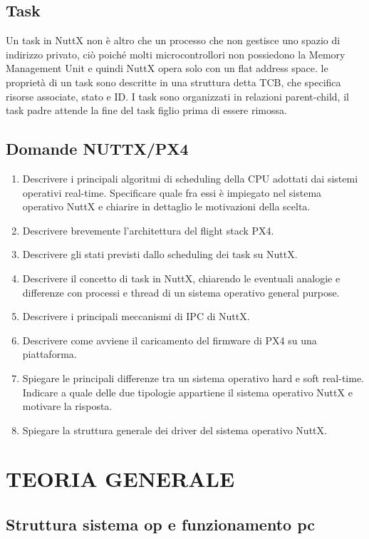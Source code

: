 \documentclass{report}
\begin{document}
\section{Task}
 Un task in NuttX non è altro che un processo che non gestisce uno spazio di indirizzo privato, ciò poiché molti microcontrollori non possiedono la Memory Management Unit e quindi NuttX opera solo con un flat address space. le proprietà di un task sono descritte in una struttura detta TCB, che specifica risorse associate, stato e ID. I task sono organizzati in relazioni parent-child, il task padre attende la fine del task figlio prima di essere rimossa.
\newpage
\section{Domande NUTTX/PX4}
\begin{enumerate}
    \item Descrivere i principali algoritmi di scheduling della CPU adottati dai sistemi operativi real-time. Specificare quale fra essi è impiegato nel sistema operativo NuttX e chiarire in dettaglio le motivazioni della scelta.
    \item Descrivere brevemente l’architettura del flight stack PX4.
    \item Descrivere gli stati previsti dallo scheduling dei task su NuttX.
    \item Descrivere il concetto di task in NuttX, chiarendo le eventuali analogie e differenze con processi e thread di un sistema operativo general purpose.
    \item Descrivere i principali meccanismi di IPC di NuttX.
    \item Descrivere come avviene il caricamento del firmware di PX4 su una piattaforma.
    \item Spiegare le principali differenze tra un sistema operativo hard e soft real-time. Indicare a quale delle due tipologie appartiene il sistema operativo NuttX e motivare la risposta.
    \item Spiegare la struttura generale dei driver del sistema operativo NuttX.
\end{enumerate}


\chapter{TEORIA GENERALE}
\section{Struttura sistema op e funzionamento pc}
\end{document}
